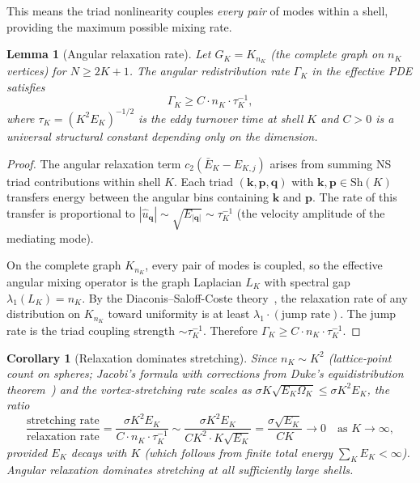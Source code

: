 \documentclass[11pt,a4paper]{article}
\newtheorem{lemma}[theorem]{Lemma}
\newtheorem{corollary}[theorem]{Corollary}
\theoremstyle{remark}
\begin{document}
This means the triad nonlinearity couples \emph{every pair} of modes within a shell, providing the maximum possible mixing rate.

\begin{lemma}[Angular relaxation rate]\label{lem:gamma-bound}
Let $G_K = K_{n_K}$ (the complete graph on $n_K$ vertices) for $N \geq 2K+1$.  The angular redistribution rate $\Gamma_K$ in the effective PDE satisfies
\[
  \Gamma_K \geq C \cdot n_K \cdot \tau_K^{-1},
\]
where $\tau_K = (K^2 E_K)^{-1/2}$ is the eddy turnover time at shell $K$ and $C > 0$ is a universal structural constant depending only on the dimension.
\end{lemma}

\begin{proof}
The angular relaxation term $c_2(\bar{E}_K - E_{K,j})$ arises from summing NS triad contributions within shell $K$.  Each triad $(\mathbf{k}, \mathbf{p}, \mathbf{q})$ with $\mathbf{k}, \mathbf{p} \in \mathrm{Sh}(K)$ transfers energy between the angular bins containing $\mathbf{k}$ and $\mathbf{p}$.  The rate of this transfer is proportional to $|\hat{u}_{\mathbf{q}}| \sim \sqrt{E_{|\mathbf{q}|}} \sim \tau_K^{-1}$ (the velocity amplitude of the mediating mode).

On the complete graph $K_{n_K}$, every pair of modes is coupled, so the effective angular mixing operator is the graph Laplacian $L_K$ with spectral gap $\lambda_1(L_K) = n_K$.  By the Diaconis--Saloff-Coste theory~\cite{diaconis1996}, the relaxation rate of any distribution on $K_{n_K}$ toward uniformity is at least $\lambda_1 \cdot (\text{jump rate})$.  The jump rate is the triad coupling strength $\sim \tau_K^{-1}$.  Therefore $\Gamma_K \geq C \cdot n_K \cdot \tau_K^{-1}$.
\end{proof}

\begin{corollary}[Relaxation dominates stretching]\label{cor:relaxation-wins}
Since $n_K \sim K^2$ (lattice-point count on spheres; Jacobi's formula with corrections from Duke's equidistribution theorem~\cite{duke1988}) and the vortex-stretching rate scales as $\sigma K \sqrt{E_K \Omega_K} \leq \sigma K^2 E_K$, the ratio
\[
  \frac{\text{stretching rate}}{\text{relaxation rate}} = \frac{\sigma K^2 E_K}{C \cdot n_K \cdot \tau_K^{-1}} \sim \frac{\sigma K^2 E_K}{C K^2 \cdot K \sqrt{E_K}} = \frac{\sigma \sqrt{E_K}}{C K} \to 0
  \quad \text{as } K \to \infty,
\]
provided $E_K$ decays with $K$ (which follows from finite total energy $\sum_K E_K < \infty$).  Angular relaxation dominates stretching at all sufficiently large shells.
\end{corollary}
\end{document}
